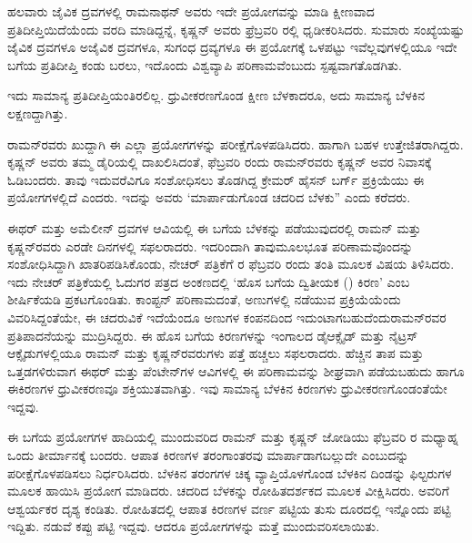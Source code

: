 \vskip 2pt

ಹಲವಾರು ಜೈವಿಕ ದ್ರವಗಳಲ್ಲಿ ರಾಮನಾಥನ್ ಅವರು ಇದೇ ಪ್ರಯೋಗವನ್ನು ಮಾಡಿ ಕ್ಷೀಣವಾದ ಪ್ರತಿದೀಪ್ತಿಯಿದೆಯೆಂದು ವರದಿ ಮಾಡಿದ್ದನ್ನೆ, ಕೃಷ್ಣನ್ ಅವರು ಫ್ರೆಬ್ರವರಿ ರಲ್ಲಿ ಧೃಡೀಕರಿಸಿದರು. ಸುಮಾರು  ಸಂಖ್ಯೆಯಷ್ಟು ಜೈವಿಕ ದ್ರವಗಳೂ ಅಜೈವಿಕ ದ್ರವಗಳೂ, ಸುಗಂಧ ದ್ರವ್ಯಗಳೂ ಈ ಪ್ರಯೋಗಕ್ಕೆ ಒಳಪಟ್ಟು ಇವೆಲ್ಲವುಗಳಲ್ಲಿಯೂ ಇದೇ ಬಗೆಯ ಪ್ರತಿದೀಪ್ತಿ ಕಂಡು ಬರಲು, ಇದೊಂದು ವಿಶ್ವವ್ಯಾಪಿ ಪರಿಣಾಮವೆಂಬುದು ಸ್ಪಷ್ಟವಾಗತೊಡಗಿತು. 

\vskip 2pt

ಇದು ಸಾಮಾನ್ಯ ಪ್ರತಿದೀಪ್ತಿಯಂತಿರಲಿಲ್ಲ. ಧ್ರುವೀಕರಣಗೊಂಡ ಕ್ಷೀಣ ಬೆಳಕಾದರೂ, ಅದು ಸಾಮಾನ್ಯ ಬೆಳಕಿನ ಲಕ್ಷಣದ್ದಾಗಿತ್ತು.

\vskip 2pt

ರಾಮನ್‍ರವರು ಖುದ್ದಾಗಿ ಈ ಎಲ್ಲಾ ಪ್ರಯೋಗಗಳನ್ನು ಪರೀಕ್ಷೆಗೊಳಪಡಿಸಿದರು. ಹಾಗಾಗಿ ಬಹಳ ಉತ್ತೇಜಿತರಾಗಿದ್ದರು. ಕೃಷ್ಣನ್ ಅವರು ತಮ್ಮ ಡೈರಿಯಲ್ಲಿ ದಾಖಲಿಸಿದಂತೆ, ಫೆಬ್ರವರಿ  ರಂದು ರಾಮನ್‍ರವರು ಕೃಷ್ಣನ್ ಅವರ ನಿವಾಸಕ್ಕೆ ಓಡಿಬಂದರು. ತಾವು ಇದುವರೆವಿಗೂ ಸಂಶೋಧಿಸಲು ತೊಡಗಿದ್ದ ಕ್ರೇಮರ್ ಹೈಸನ್ ಬರ್ಗ್ ಪ್ರಕ್ರಿಯೆಯು ಈ ಪ್ರಯೋಗಗಳಲ್ಲಿದೆ ಎಂದರು. ಇದನ್ನು ಅವರು ‘ಮಾರ್ಪಾಡುಗೊಂಡ ಚದರಿದ ಬೆಳಕು” ಎಂದು ಕರೆದರು.

\vskip 2pt

ಈಥರ್ ಮತ್ತು ಅಮೆಲೀನ್ ದ್ರವಗಳ ಆವಿಯಲ್ಲಿ ಈ ಬಗೆಯ ಬೆಳಕನ್ನು ಪಡೆಯುವುದರಲ್ಲಿ ರಾಮನ್ ಮತ್ತು ಕೃಷ್ಣನ್‍ರವರು ಎರಡೇ ದಿನಗಳಲ್ಲಿ ಸಫಲರಾದರು. ಇದರಿಂದಾಗಿ ತಾವು\break ಮೂಲಭೂತ ಪರಿಣಾಮವೊಂದನ್ನು ಸಂಶೋಧಿಸಿದ್ದಾಗಿ ಖಾತರಿಪಡಿಸಿಕೊಂಡು, ನೇಚರ್ ಪತ್ರಿಕೆಗೆ ರ ಫೆಬ್ರವರಿ ರಂದು ತಂತಿ ಮೂಲಕ ವಿಷಯ ತಿಳಿಸಿದರು. ಇದು ನೇಚರ್ ಪತ್ರಿಕೆಯಲ್ಲಿ ಓದುಗರ ಪತ್ರದ ಅಂಕಣದಲ್ಲಿ ‘ಹೊಸ ಬಗೆಯ ದ್ವಿತೀಯಕ () ಕಿರಣ’ ಎಂಬ ಶೀರ್ಷಿಕೆಯಡಿ ಪ್ರಕಟಗೊಂಡಿತು. ಕಾಂಪ್ಟನ್ ಪರಿಣಾಮದಂತೆ, ಅಣುಗಳಲ್ಲಿ ನಡೆಯುವ ಪ್ರಕ್ರಿಯೆಯೆಂದು ವಿವರಿಸಿದ್ದಂತೆಯೇ, ಈ ಚದರುವಿಕೆ ಇದೆಯೆಂದೂ ಅಣುಗಳ ಕಂಪನದಿಂದ ಇದುಂಟಾಗಬಹುದೆಂದು\enginline{-}ರಾಮನ್‍ರವರ ಪ್ರತಿಪಾದನೆಯನ್ನು ಮುದ್ರಿಸಿದ್ದರು. ಈ ಹೊಸ ಬಗೆಯ ಕಿರಣಗಳನ್ನು ಇಂಗಾಲದ ಡೈಆಕ್ಸೈಡ್ ಮತ್ತು ನೈಟ್ರಸ್ ಆಕ್ಸೈಡುಗಳಲ್ಲಿಯೂ ರಾಮನ್ ಮತ್ತು ಕೃಷ್ಣನ್‍ರವರುಗಳು ಪತ್ತೆ ಹಚ್ಚಲು ಸಫಲರಾದರು. ಹೆಚ್ಚಿನ ತಾಪ ಮತ್ತು ಒತ್ತಡಗಳಿರುವಾಗ ಈಥರ್ ಮತ್ತು ಪೆಂಟೇನ್‍ಗಳ ಆವಿಗಳಲ್ಲಿ ಈ ಪರಿಣಾಮವನ್ನು ಶೀಘ್ರವಾಗಿ ಪಡೆಯಬಹುದು ಹಾಗೂ ಈ\break ಕಿರಣಗಳ ಧ್ರುವೀಕರಣವೂ ಶಕ್ತಿಯುತವಾಗಿತ್ತು. ಇವು ಸಾಮಾನ್ಯ ಬೆಳಕಿನ ಕಿರಣಗಳು ಧ್ರುವೀಕರಣಗೊಂಡಂತೆಯೇ ಇದ್ದವು.

ಈ ಬಗೆಯ ಪ್ರಯೋಗಗಳ ಹಾದಿಯಲ್ಲಿ ಮುಂದುವರಿದ ರಾಮನ್ ಮತ್ತು ಕೃಷ್ಣನ್ ಜೋಡಿಯು  ಫೆಬ್ರವರಿ ರ ಮಧ್ಯಾಹ್ನ ಒಂದು ತೀರ್ಮಾನಕ್ಕೆ ಬಂದರು. ಆಪಾತ ಕಿರಣಗಳ ತರಂಗಾಂತರವು ಮಾರ್ಪಾಡಾಗಬಲ್ಲುದೇ ಎಂಬುದನ್ನು ಪರೀಕ್ಷೆಗೊಳಪಡಿಸಲು ನಿರ್ಧರಿಸಿದರು. ಬೆಳಕಿನ ತರಂಗಗಳ ಚಿಕ್ಕ ವ್ಯಾಪ್ತಿಯೊಳಗೊಂಡ ಬೆಳಕಿನ ದಿಂಡನ್ನು ಫಿಲ್ಟರುಗಳ ಮೂಲಕ ಹಾಯಿಸಿ ಪ್ರಯೋಗ ಮಾಡಿದರು. ಚದರಿದ ಬೆಳಕನ್ನು ರೋಹಿತದರ್ಶಕದ ಮೂಲಕ ವೀಕ್ಷಿಸಿದರು. ಅವರಿಗೆ ಆಶ್ವರ್ಯಕರ ದೃಶ್ಯ ಕಂಡಿತು. ರೋಹಿತದಲ್ಲಿ ಆಪಾತ ಕಿರಣಗಳ ವರ್ಣ ಪಟ್ಟಿಯ ತುಸು ದೂರದಲ್ಲಿ ಇನ್ನೊಂದು ಪಟ್ಟಿ ಇದ್ದಿತು. ನಡುವೆ ಕಪ್ಪು ಪಟ್ಟಿ ಇದ್ದವು. ಆದರೂ ಪ್ರಯೋಗಗಳನ್ನು ಮತ್ತೆ ಮುಂದುವರಿಸಲಾಯಿತು.

